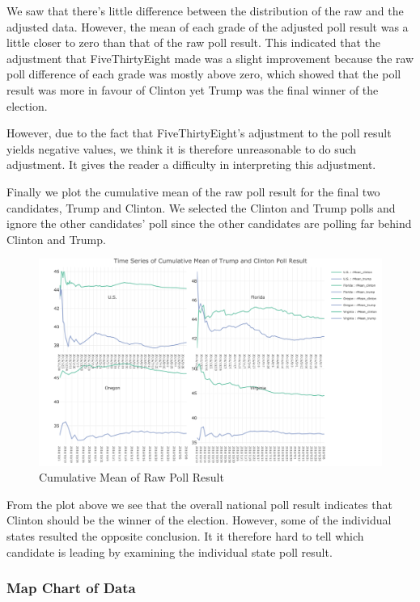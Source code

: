 \documentclass[
  12pt,
]{article}
\begin{document}
We saw that there's little difference between the distribution of the
raw and the adjusted data. However, the mean of each grade of the
adjusted poll result was a little closer to zero than that of the raw
poll result. This indicated that the adjustment that FiveThirtyEight
made was a slight improvement because the raw poll difference of each
grade was mostly above zero, which showed that the poll result was more
in favour of Clinton yet Trump was the final winner of the election.

However, due to the fact that FiveThirtyEight's adjustment to the poll
result yields negative values, we think it is therefore unreasonable to
do such adjustment. It gives the reader a difficulty in interpreting
this adjustment.

Finally we plot the cumulative mean of the raw poll result for the final
two candidates, Trump and Clinton. We selected the Clinton and Trump
polls and ignore the other candidates' poll since the other candidates
are polling far behind Clinton and Trump.

\begin{figure}
\centering
\includegraphics{./Figures/cMeanchart.png}
\caption{Cumulative Mean of Raw Poll Result}
\end{figure}

From the plot above we see that the overall national poll result
indicates that Clinton should be the winner of the election. However,
some of the individual states resulted the opposite conclusion. It it
therefore hard to tell which candidate is leading by examining the
individual state poll result.

\hypertarget{map-chart-of-data}{%
\subsubsection{Map Chart of Data}\label{map-chart-of-data}}
\end{document}
